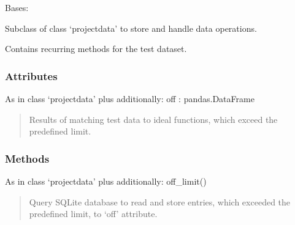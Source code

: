 \documentclass[letterpaper,10pt,english]{sphinxmanual}
\begin{document}
\begin{fulllineitems}
\label{\detokenize{_autosummary/functionfinder.classes.testdata:functionfinder.classes.testdata}}
\pysigstartsignatures
{}
\pysigstopsignatures
\sphinxAtStartPar
Bases: {\hyperref[\detokenize{_autosummary/functionfinder.classes.projectdata:functionfinder.classes.projectdata}]{}}

\sphinxAtStartPar
Subclass of class ‘projectdata’ to store and handle data operations.

\sphinxAtStartPar
Contains recurring methods for the test dataset.


\subsubsection{Attributes}
\label{\detokenize{_autosummary/functionfinder.classes.testdata:attributes}}
\sphinxAtStartPar
As in class ‘projectdata’ plus additionally:
off : pandas.DataFrame
\begin{quote}

\sphinxAtStartPar
Results of matching test data to ideal functions, which exceed the
predefined limit.
\end{quote}


\subsubsection{Methods}
\label{\detokenize{_autosummary/functionfinder.classes.testdata:methods}}
\sphinxAtStartPar
As in class ‘projectdata’ plus additionally:
off\_limit()
\begin{quote}

\sphinxAtStartPar
Query SQLite database to read and store entries, which exceeded the
predefined limit, to ‘off’ attribute.
\end{quote}


\end{fulllineitems}
\end{document}

